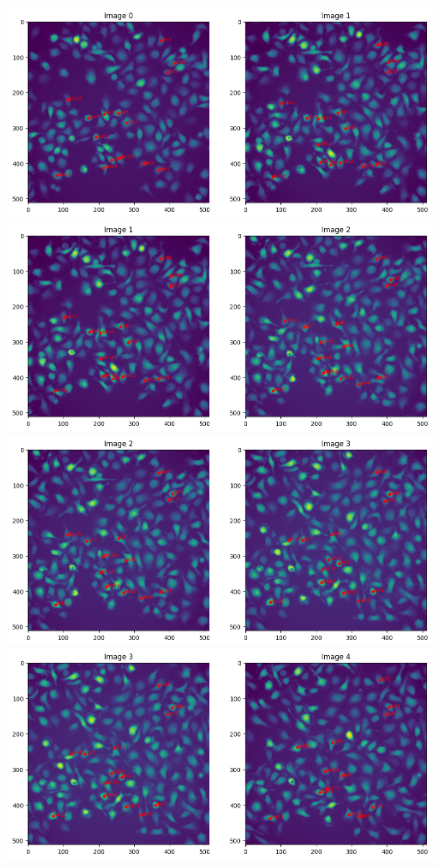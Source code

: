 \documentclass{article}
\begin{document}
\begin{figure}[h!]
\centering
\includegraphics[width=0.75\linewidth]{Report/RImages/Traces_Growth/trace-b1.png}
\includegraphics[width=0.75\linewidth]{Report/RImages/Traces_Growth/trace-b2.png}
\includegraphics[width=0.75\linewidth]{Report/RImages/Traces_Growth/trace-b3.png}
\includegraphics[width=0.75\linewidth]{Report/RImages/Traces_Growth/trace-b4.png}
\end{figure}

\clearpage
\end{document}
